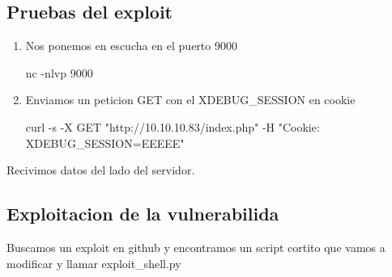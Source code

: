 \documentclass{assets/ipesethesis}
\newenvironment{Shaded}{\begin{snugshade}}{\end{snugshade}}
\newcommand{\ExtensionTok}[1]{#1}
\newcommand{\NormalTok}[1]{#1}
\newcommand{\StringTok}[1]{\textcolor[rgb]{0.31,0.60,0.02}{#1}}
\begin{document}
\hypertarget{pruebas-del-exploit}{%
\subsection*{Pruebas del exploit}\label{pruebas-del-exploit}}

\begin{enumerate}
\def\labelenumi{\arabic{enumi}.}
\item
  Nos ponemos en escucha en el puerto 9000

\begin{Shaded}
\begin{Highlighting}[]
\ExtensionTok{nc}\NormalTok{ -nlvp 9000}
\end{Highlighting}
\end{Shaded}
\item
  Enviamos un peticion GET con el XDEBUG\_SESSION en cookie

\begin{Shaded}
\begin{Highlighting}[]
\ExtensionTok{curl}\NormalTok{ -s -X GET }\StringTok{"http://10.10.10.83/index.php"}\NormalTok{ -H }\StringTok{"Cookie: XDEBUG_SESSION=EEEEE"}
\end{Highlighting}
\end{Shaded}
\end{enumerate}

Recivimos datos del lado del servidor.

\hypertarget{exploitacion-de-la-vulnerabilida}{%
\subsection*{Exploitacion de la vulnerabilida}\label{exploitacion-de-la-vulnerabilida}}

Buscamos un exploit en github y encontramos un script cortito que vamos a modificar y llamar exploit\_shell.py
\end{document}

